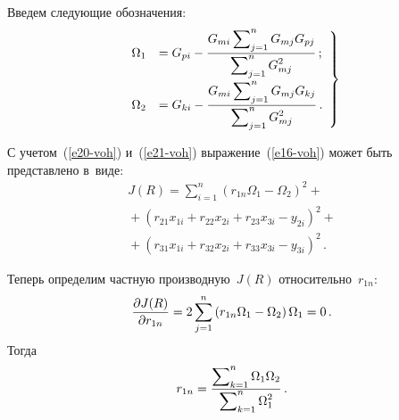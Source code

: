 \begin{multicols}{2}
  Введем следующие обозначения:
  \begin{equation}
  \left.
  \begin{array}{rl}
  \Omega_1 &= G_{pi} -\displaystyle\frac{\displaystyle G_{mi} \sum\nolimits^n_{j=1} G_{mj}G_{pj}\mathstrut}{\displaystyle \sum\nolimits^n_{j=1} G_{mj}^2\mathstrut}\,;\\[16pt]
  \Omega_2 &= G_{ki} -\displaystyle\frac{\displaystyle  G_{mi} \sum\nolimits^n_{j=1} G_{mj}G_{kj}\mathstrut}{\displaystyle \sum\nolimits^n_{j=1} G_{mj}^2\mathstrut}\,.
  \end{array}
  \right\}
  \label{e21-voh}
  \end{equation}
  
  С учетом~(\ref{e20-voh}) и~(\ref{e21-voh}) выражение~(\ref{e16-voh}) может 
быть пред\-став\-ле\-но в~виде:
  \begin{multline*}
  J(R)=\sum\limits^n_{i=1} \left( r_{1n} \Omega_1-\Omega_2\right)^2+{}\\
  {}+
  \left( r_{21}x_{1i} +r_{22}x_{2i} +r_{23}x_{3i}-y_{2i}\right)^2+{}\\
  {}+ \left( r_{31}x_{1i} +r_{32}x_{2i} +r_{33}x_{3i}-y_{3i}\right)^2\,.
  \end{multline*}
  
  Теперь определим част\-ную производную~$J(R)$ относительно~$r_{1n}$:
  \begin{equation*}
  \displaystyle\frac{\displaystyle \partial J(R)\mathstrut}{\displaystyle \partial r_{1{n}}\mathstrut} =2\sum\limits^n_{j=1} \left( r_{1n} 
\Omega_1 -\Omega_2\right) \Omega_1=0\,.
  \end{equation*}
  Тогда 
  $$
  r_{1n}=\displaystyle\frac{\displaystyle \sum\nolimits^n_{k=1} \Omega_1\Omega_2\mathstrut}{\displaystyle \sum\nolimits^n_{k=1} 
\Omega_1^2\mathstrut}\,.
  $$
  

\end{multicols}
